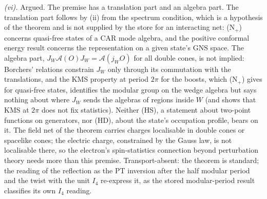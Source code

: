 \emph{(vi).} Argued. The premise has a translation part and an algebra part. The translation part follows by (ii) from the spectrum condition, which is a hypothesis of the theorem and is not supplied by the store for an interacting net: (N$_{+}$) concerns quasi-free states of a CAR mode algebra, and the positive conformal energy result concerns the representation on a given state's GNS space. The algebra part, $J_{W}\mathcal{A}(O)J_{W} = \mathcal{A}(j_{W}O)$ for all double cones, is not implied: Borchers' relations constrain $J_{W}$ only through its commutation with the translations, and the KMS property at period $2\pi$ for the boosts, which (N$_{+}$) gives for quasi-free states, identifies the modular group on the wedge algebra but says nothing about where $J_{W}$ sends the algebras of regions inside $W$ (and  shows that KMS at $2\pi$ does not fix statistics). Neither (HS), a statement about two-point functions on generators, nor (HD), about the state's occupation profile, bears on it. The field net of the theorem carries charges localisable in double cones or spacelike cones; the electric charge, constrained by the Gauss law, is not localisable there, so the electron's spin-statistics connection beyond perturbation theory needs more than this premise. Transport-absent: the theorem is standard; the reading of the reflection as the PT inversion after the half modular period and the twist with the unit $I_{4}$ re-express it, as the stored modular-period result classifies its own $I_{4}$ reading.
